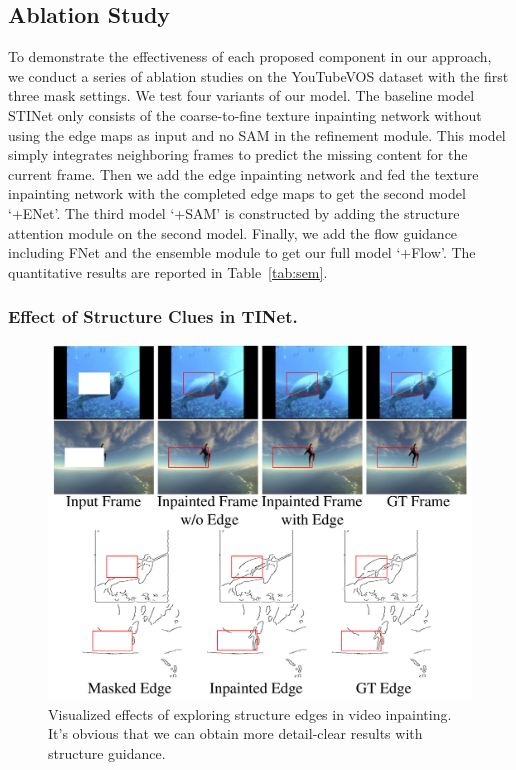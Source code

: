 \subsection{Ablation Study}
To demonstrate the effectiveness of each proposed component in our approach, we conduct a series of ablation studies on the YouTubeVOS dataset with the first three mask settings.  
%
We test four variants of our model. 
The baseline model STINet only consists of the coarse-to-fine texture inpainting network without using the edge maps as input and no SAM in the refinement module.
This model simply integrates neighboring frames to predict the missing content for the current frame.
%
Then we add the edge inpainting network and fed the texture inpainting network with the completed edge maps to get the second model `+ENet'.
The third model `+SAM' is constructed by adding the structure attention module on the second model. 
Finally, we add the flow guidance including FNet and the ensemble module to get our full model `+Flow'.
The quantitative results are reported in Table~\ref{tab:sem}. 


\subsubsection{Effect of Structure Clues in TINet.}


\begin{figure}[!ht]
	\centering
	\includegraphics[width=0.97\columnwidth]{edgevis} %
	\caption{Visualized effects of exploring structure edges in video inpainting. It's obvious that we can obtain more detail-clear results with structure guidance.}
	\label{edgevis}
\end{figure}


